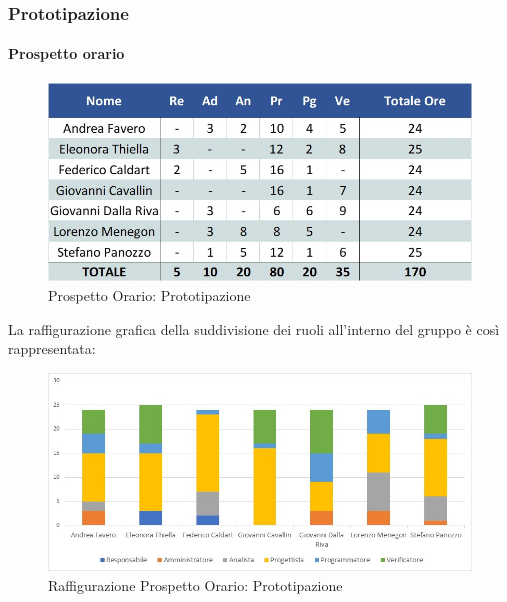 \subsubsection{Prototipazione}
\paragraph{Prospetto orario}
\begin{figure}[h!]
	\centerline{\includegraphics[scale=0.4]{img/Preventivo/PrototipazioneOrario.jpg}}
	\caption{Prospetto Orario: Prototipazione}
\end{figure}
La raffigurazione grafica della suddivisione dei ruoli all'interno del gruppo è così rappresentata: 
\begin{figure}[h!]
	\centerline{\includegraphics[scale=0.4]{img/Preventivo/Istogrammi/Prototipazione.jpg}}
	\caption{Raffigurazione Prospetto Orario: Prototipazione}
\end{figure}
